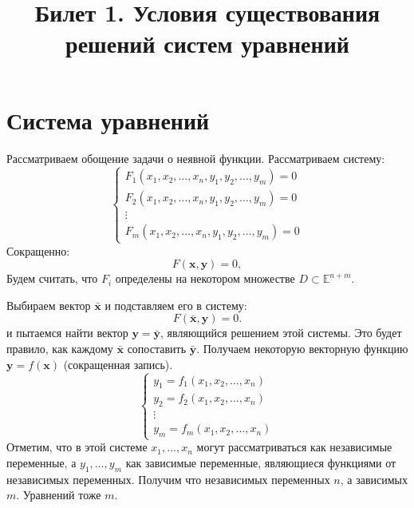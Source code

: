 \documentclass{article}
\title{Билет 1. Условия существования решений систем уравнений}
\author{}
\date{}
\theoremstyle{plain}
\theoremstyle{definition}
\theoremstyle{remark}
\begin{document}
\maketitle

\section*{Система уравнений}
Рассматриваем обощение задачи о неявной функции. Рассматриваем систему:
\begin{equation}
    \begin{cases}
        F_1(x_1, x_2, \ldots, x_n, y_1, y_2, \ldots, y_m) = 0 \\
        F_2(x_1, x_2, \ldots, x_n, y_1, y_2, \ldots, y_m) = 0 \\
        \vdots \\
        F_m(x_1, x_2, \ldots, x_n, y_1, y_2, \ldots, y_m) = 0
    \end{cases}
\end{equation}
Сокращенно:
\begin{equation}
    F(\mathbf{x}, \mathbf{y}) = 0,
\end{equation}
Будем считать, что $F_i$ определены на 
некотором множестве $D \subset \mathbb{E}^{n+m}$.

Выбираем вектор $\bar{\mathbf{x}}$ и подставляем его в систему:
\begin{equation}
    F(\bar{\mathbf{x}}, \mathbf{y}) = 0.
\end{equation}
и пытаемся найти вектор $\mathbf{y} = \bar{\mathbf{y}}$, являющийся решением этой системы.
Это будет правило, как каждому $\bar{\mathbf{x}}$ сопоставить $\bar{\mathbf{y}}$.
Получаем некоторую векторную функцию $\mathbf{y} = f(\mathbf{x})$ (сокращенная запись).
\begin{equation}
    \begin{cases}
        y_1 = f_1(x_1, x_2, \ldots, x_n) \\
        y_2 = f_2(x_1, x_2, \ldots, x_n) \\
        \vdots \\
        y_m = f_m(x_1, x_2, \ldots, x_n)
    \end{cases}
\end{equation}
Отметим, что в этой системе $x_1, \ldots, x_n$ могут рассматриваться как независимые переменные, а $y_1, \ldots, y_m$
как зависимые переменные, являющиеся функциями от независимых переменных. Получим что
независимых переменных $n$, а зависимых $m$. Уравнений тоже $m$.
\end{document}
